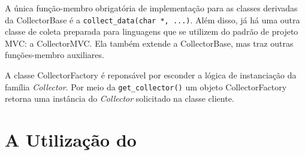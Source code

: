 A única função-membro obrigatória de implementação para as classes derivadas da
\textsf{CollectorBase} é a \lstinline|collect_data(char *, ...)|. Além disso, já
há uma outra classe de coleta preparada para linguagens que se utilizem do padrão
de projeto MVC: a \textsf{CollectorMVC}. Ela também extende a \textsf{CollectorBase},
mas traz outras funções-membro auxiliares.

A classe \textsf{CollectorFactory} é reponsável por esconder a lógica de instanciação
da família \textit{Collector}. Por meio da \lstinline|get_collector()| um objeto
\textsf{CollectorFactory} retorna uma instância do \textit{Collector} solicitado na
classe cliente.

\section{A Utilização do \scarefault}